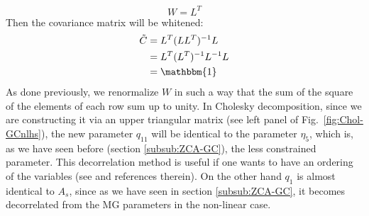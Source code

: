 \begin{equation}
W=L^{T}
\end{equation}
Then the covariance matrix will be whitened:
\begin{align}
\tilde{C} & =L^{T} (L L^{T})^{-1} L\\
& =L^{T} (L^{T})^{-1} L^{-1} L\\
& =\mathbbm{1}
\end{align}
As done previously, we renormalize $W$ in such a way that the sum of the square of the elements of each row sum up to
unity.
In Cholesky decomposition, since we are constructing it via an upper triangular matrix (see left panel of Fig.\ \ref{fig:Chol-GCnlhs}), 
the new parameter $q_{11}$ will be identical 
to the parameter $\eta_5$, which is, as we have seen before (section \ref{subsub:ZCA-GC}), the less constrained parameter. This decorrelation method
is useful if one wants to have an ordering of the variables (see \cite{kessy_optimal_2015} and references therein).
On the other hand $q_1$ is almost identical to $A_s$, since as we have seen in section \ref{subsub:ZCA-GC},
it becomes decorrelated from the MG parameters in the non-linear case.

